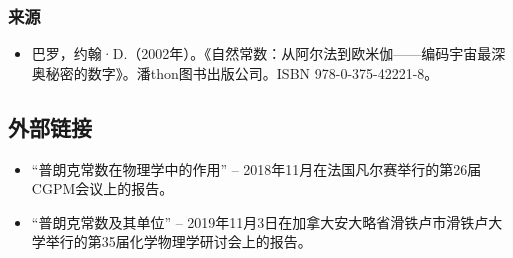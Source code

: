 \subsubsection{来源}  
\begin{itemize}
\item 巴罗，约翰·D.（2002年）。《自然常数：从阿尔法到欧米伽——编码宇宙最深奥秘密的数字》。潘thon图书出版公司。ISBN 978-0-375-42221-8。
\end{itemize}
\subsection{外部链接}  
\begin{itemize}
\item “普朗克常数在物理学中的作用” – 2018年11月在法国凡尔赛举行的第26届CGPM会议上的报告。  
\item “普朗克常数及其单位” – 2019年11月3日在加拿大安大略省滑铁卢市滑铁卢大学举行的第35届化学物理学研讨会上的报告。
\end{itemize}